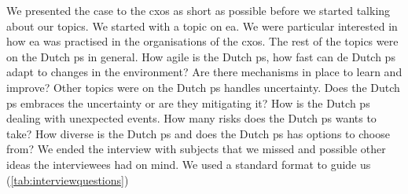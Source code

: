 We presented the case to the \glspl{cxo} as short as possible before we started talking about our topics. We started with a topic on \acrlong{ea}. We were particular interested in how \acrlong{ea} was practised in the organisations of the \glspl{cxo}. The rest of the topics were on the Dutch \gls{ps} in general. How \gls{agile} is the Dutch \gls{ps}, how fast can de Dutch \gls{ps} adapt to changes in the environment? Are there mechanisms in place to learn and improve? Other topics were on the Dutch \gls{ps} handles \gls{uncertainty}. Does the Dutch \gls{ps} embraces the \gls{uncertainty} or are they mitigating it? How is the Dutch \gls{ps} dealing with unexpected events. How many risks does the Dutch \gls{ps} wants to take? How diverse is the Dutch \gls{ps} and does the Dutch \gls{ps} has options to choose from? We ended the interview with subjects that we missed and possible other ideas the interviewees had on mind. We used a standard format to guide us (\cref{tab:interviewquestions})

